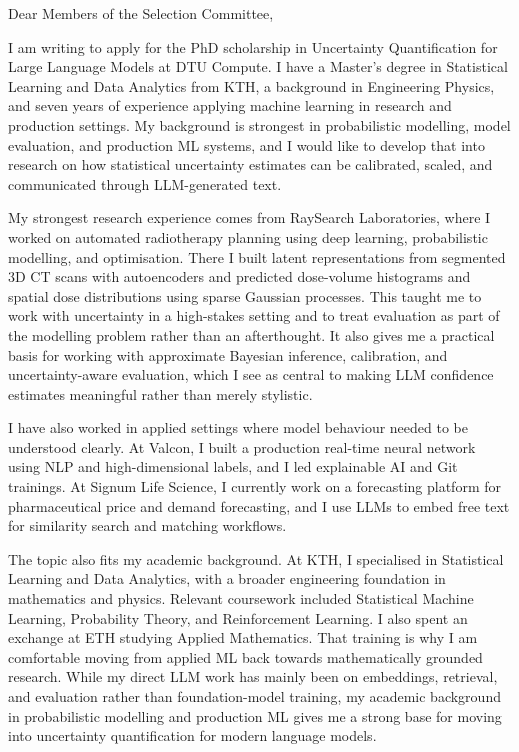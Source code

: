 \documentclass[11pt,a4paper]{moderncv}
\begin{document}
\makecvtitle
Dear Members of the Selection Committee,

\vspace*{2em}
I am writing to apply for the PhD scholarship in Uncertainty Quantification for Large Language Models at DTU Compute. I have a Master's degree in Statistical Learning and Data Analytics from KTH, a background in Engineering Physics, and seven years of experience applying machine learning in research and production settings. My background is strongest in probabilistic modelling, model evaluation, and production ML systems, and I would like to develop that into research on how statistical uncertainty estimates can be calibrated, scaled, and communicated through LLM-generated text.

\hspace*{2em}
My strongest research experience comes from RaySearch Laboratories, where I worked on automated radiotherapy planning using deep learning, probabilistic modelling, and optimisation. There I built latent representations from segmented 3D CT scans with autoencoders and predicted dose-volume histograms and spatial dose distributions using sparse Gaussian processes. This taught me to work with uncertainty in a high-stakes setting and to treat evaluation as part of the modelling problem rather than an afterthought. It also gives me a practical basis for working with approximate Bayesian inference, calibration, and uncertainty-aware evaluation, which I see as central to making LLM confidence estimates meaningful rather than merely stylistic.

\hspace*{2em}
I have also worked in applied settings where model behaviour needed to be understood clearly. At Valcon, I built a production real-time neural network using NLP and high-dimensional labels, and I led explainable AI and Git trainings. At Signum Life Science, I currently work on a forecasting platform for pharmaceutical price and demand forecasting, and I use LLMs to embed free text for similarity search and matching workflows.

\hspace*{2em}
The topic also fits my academic background. At KTH, I specialised in Statistical Learning and Data Analytics, with a broader engineering foundation in mathematics and physics. Relevant coursework included Statistical Machine Learning, Probability Theory, and Reinforcement Learning. I also spent an exchange at ETH studying Applied Mathematics. That training is why I am comfortable moving from applied ML back towards mathematically grounded research. While my direct LLM work has mainly been on embeddings, retrieval, and evaluation rather than foundation-model training, my academic background in probabilistic modelling and production ML gives me a strong base for moving into uncertainty quantification for modern language models.
\end{document}
